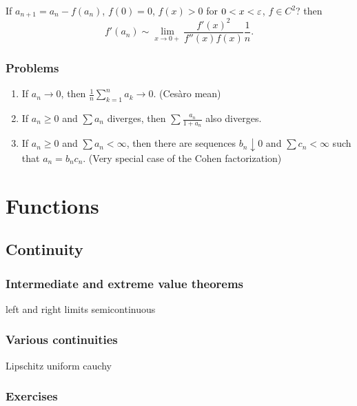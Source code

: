 \documentclass{../../large}
\begin{document}
\begin{prb}
If $a_{n+1}=a_n-f(a_n)$, $f(0)=0$, $f(x)>0$ for $0<x<\varepsilon$, $f\in C^2$? then
\[f'(a_n)\sim\lim_{x\to0+}\frac{f'(x)^2}{f''(x)f(x)}\frac1n.\]
\end{prb}
\section*{Problems}
\begin{enumerate}
\item If $a_n\to0$, then $\frac1n\sum_{k=1}^na_k\to0$. (Ces\`aro mean)
\item If $a_n\ge0$ and $\sum a_n$ diverges, then $\sum\frac{a_n}{1+a_n}$ also diverges.
\item If $a_n\ge0$ and $\sum a_n<\infty$, then there are sequences $b_n\downarrow0$ and $\sum c_n<\infty$ such that $a_n=b_nc_n$. (Very special case of the Cohen factorization)
\end{enumerate}






\part{Functions}

\chapter{Continuity}
\section{Intermediate and extreme value theorems}

left and right limits
semicontinuous


\section{Various continuities}

Lipschitz
uniform
cauchy


\section*{Exercises}
\end{document}
